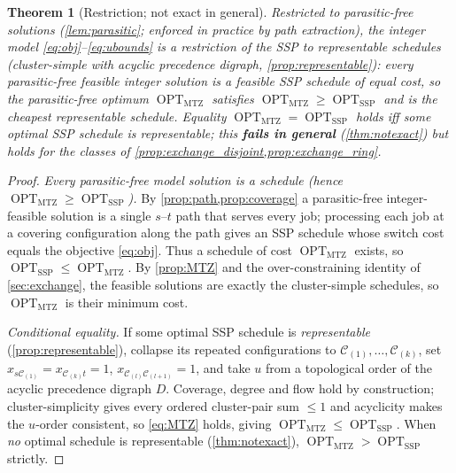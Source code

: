 \documentclass[11pt,a4paper]{article}
\theoremstyle{plain}
\newtheorem{theorem}{Theorem}[section]
\theoremstyle{definition}
\DeclareMathOperator{\OPT}{OPT}
\newcommand{\OMTZ}{\OPT_{\mathrm{MTZ}}}
\newcommand{\OSSP}{\OPT_{\mathrm{SSP}}}
\begin{document}
\begin{thmbox}
	\begin{theorem}[Restriction; not exact in general]
		\label{thm:correct}
		Restricted to \emph{parasitic-free} solutions (\cref{lem:parasitic}; enforced in
		practice by path extraction), the integer model \eqref{eq:obj}--\eqref{eq:ubounds} is
		a \emph{restriction} of the SSP to \emph{representable} schedules (cluster-simple with
		acyclic precedence digraph, \cref{prop:representable}): every parasitic-free feasible
		integer solution is a feasible SSP schedule of equal cost, so the parasitic-free
		optimum $\OMTZ$ satisfies $\OMTZ\ge\OSSP$ and is the cheapest representable schedule.
		Equality $\OMTZ=\OSSP$ holds \emph{iff} some optimal SSP schedule is representable; this
		\textbf{fails in general} (\cref{thm:notexact}) but holds for the classes of
		\cref{prop:exchange_disjoint,prop:exchange_ring}.
	\end{theorem}
\end{thmbox}
\begin{proofbox}
	\begin{proof}
		\emph{Every parasitic-free model solution is a schedule (hence $\OMTZ\ge\OSSP$).} By
		\cref{prop:path,prop:coverage} a parasitic-free integer-feasible solution is a single $s$--$t$ path
		that serves every job; processing each job at a covering configuration along the path
		gives an SSP schedule whose switch cost equals the objective \eqref{eq:obj}. Thus a
		schedule of cost $\OMTZ$ exists, so $\OSSP\le\OMTZ$. By \cref{prop:MTZ} and the
		over-constraining identity of \cref{sec:exchange}, the feasible solutions are exactly the
		cluster-simple schedules, so $\OMTZ$ is their minimum cost.

		\emph{Conditional equality.} If some optimal SSP schedule is \emph{representable}
		(\cref{prop:representable}), collapse its repeated configurations to
		$\mathcal{C}_{(1)},\dots,\mathcal{C}_{(k)}$, set
		$x_{s\mathcal{C}_{(1)}}=x_{\mathcal{C}_{(k)}t}=1$,
		$x_{\mathcal{C}_{(l)}\mathcal{C}_{(l+1)}}=1$, and take $u$ from a topological order of the
		acyclic precedence digraph $D$. Coverage, degree and flow hold by construction;
		cluster-simplicity gives every ordered cluster-pair sum $\le1$ and acyclicity makes the
		$u$-order consistent, so \eqref{eq:MTZ} holds, giving $\OMTZ\le\OSSP$. When \emph{no}
		optimal schedule is representable (\cref{thm:notexact}), $\OMTZ>\OSSP$ strictly.
	\end{proof}
\end{proofbox}
\end{document}
